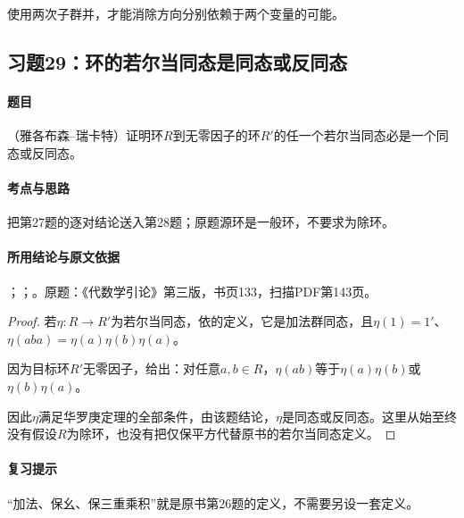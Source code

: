 使用两次子群并，才能消除方向分别依赖于两个变量的可能。



\subsection{习题29：环的若尔当同态是同态或反同态}

\label{ex:3:29}

\paragraph{题目}

（雅各布森--瑞卡特）证明环$R$到无零因子的环$R'$的任一个若尔当同态必是一个同态或反同态。

\paragraph{考点与思路}

把第27题的逐对结论送入第28题；原题源环是一般环，不要求为除环。

\paragraph{所用结论与原文依据}

；；。原题：《代数学引论》第三版，书页133，扫描PDF第143页。


\begin{proof}

若$\eta:R\to R'$为若尔当同态，依的定义，它是加法群同态，且$\eta(1)=1'$、$\eta(aba)=\eta(a)\eta(b)\eta(a)$。

因为目标环$R'$无零因子，给出：对任意$a,b\in R$，$\eta(ab)$等于$\eta(a)\eta(b)$或$\eta(b)\eta(a)$。

因此$\eta$满足华罗庚定理的全部条件，由该题结论，$\eta$是同态或反同态。这里从始至终没有假设$R$为除环，也没有把仅保平方代替原书的若尔当同态定义。

\end{proof}

\paragraph{复习提示}

“加法、保幺、保三重乘积”就是原书第26题的定义，不需要另设一套定义。



